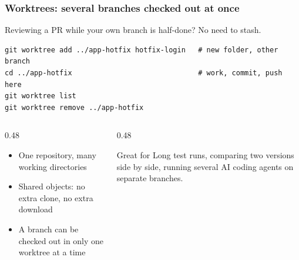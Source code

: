 \documentclass[aspectratio=169,10pt,compress]{beamer}
\begin{document}
\begin{frame}[t,fragile] \frametitle{Worktrees: several branches checked out at once}
  Reviewing a PR while your own branch is half-done? No need to stash.
\begin{lstlisting}
git worktree add ../app-hotfix hotfix-login   # new folder, other branch
cd ../app-hotfix                              # work, commit, push here
git worktree list
git worktree remove ../app-hotfix
\end{lstlisting}

  \begin{columns}[T]
    \begin{column}{0.48\textwidth}
      \small
      \begin{itemize}
        \item One repository, many working directories
        \item Shared objects: no extra clone, no extra download
        \item A branch can be checked out in only one worktree at a time
      \end{itemize}
    \end{column}
    \begin{column}{0.48\textwidth}
      \begin{block}{Great for}
        \small Long test runs, comparing two versions side by side, running
        several AI coding agents on separate branches.
      \end{block}
    \end{column}
  \end{columns}
\end{frame}
\end{document}
